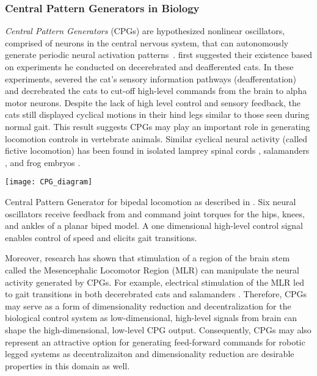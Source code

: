 \subsubsection{Central Pattern Generators in Biology}
\emph{Central Pattern Generators} (CPGs) are hypothesized nonlinear
oscillators, comprised of neurons in the central nervous system, that can
autonomously generate periodic neural activation
patterns~\citep{ijspeert2008central}.  \citet{brown1911intrinsic} first
suggested their existence based on experiments he conducted on decerebrated and
deafferented cats. In these experiments, \citeauthor{brown1911intrinsic} severed
the cat's sensory information pathways (deafferentation) and decrebrated the
cats to cut-off high-level commands from the brain to alpha motor neurons.
Despite the lack of high level control and sensory feedback, the cats still
displayed cyclical motions in their hind legs similar to those seen during
normal gait. This result suggests CPGs may play an important role in generating
locomotion controls in vertebrate animals. Similar cyclical neural activity
(called fictive locomotion) has been found in isolated lamprey spinal cords
\citep{cohen1980neuronal}, salamanders \citep{delvolve1999fictive}, and frog
embryos \citep{soffe1982tonic}. 

\begin{marginfigure}
    \centering
    \texttt{[image: CPG\_diagram]}
    \caption{Central Pattern Generator for bipedal locomotion as described in
    \citet{taga1991self}. Six neural oscillators receive feedback from and
    command joint torques for the hips, knees, and ankles of a planar biped
    model. A one dimensional high-level control signal enables control of speed
    and elicits gait transitions.}
    \label{fig:cpg_diagram}
\end{marginfigure}
Moreover, research has shown that stimulation of a region of the brain stem
called the Mesencephalic Locomotor Region (MLR) can manipulate the neural
activity generated by CPGs. For example, electrical stimulation of the MLR led
to gait transitions in both decerebrated cats \citep{shik1966control} and
salamanders \citep{cabelguen2003bimodal}.  Therefore, CPGs may serve as a form
of dimensionality reduction and decentralization for the biological control
system as low-dimensional, high-level signals from brain can shape the
high-dimensional, low-level CPG output. Consequently, CPGs may also represent an
attractive option for generating feed-forward commands for robotic legged
systems as decentralizaiton and dimensionality reduction are desirable
properties in this domain as well.


